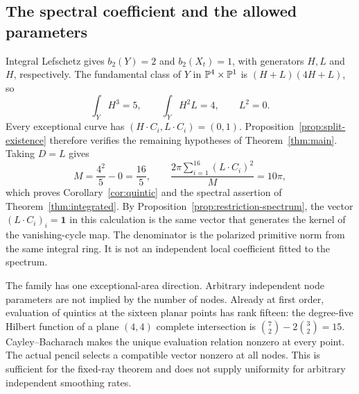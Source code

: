 \subsection{The spectral coefficient and the allowed parameters}
Integral Lefschetz gives $b_2(Y)=2$ and $b_2(X_t)=1$, with generators
$H,L$ and $H$, respectively. The fundamental class of $Y$ in
$\mathbb P^4\times\mathbb P^1$ is $(H+L)(4H+L)$, so
\begin{equation}\label{eq:split-cubic}
 \int_YH^3=5,\qquad \int_YH^2L=4,\qquad L^2=0.
\end{equation}
Every exceptional curve has $(H\cdot C_i,L\cdot C_i)=(0,1)$.
Proposition~\ref{prop:split-existence} therefore verifies the remaining
hypotheses of Theorem~\ref{thm:main}. Taking $D=L$ gives
\[
 M=\frac{4^2}{5}-0=\frac{16}{5},\qquad
 \frac{2\pi\sum_{i=1}^{16}(L\cdot C_i)^2}{M}=10\pi,
\]
which proves Corollary~\ref{cor:quintic} and the spectral assertion of
Theorem~\ref{thm:integrated}.
By Proposition~\ref{prop:restriction-spectrum}, the vector
$(L\cdot C_i)_i=\mathbf1$ in this calculation is the same vector
that generates the kernel of the vanishing-cycle map. The denominator
is the polarized primitive norm from the same integral ring. It is
not an independent local coefficient fitted to the spectrum.

The family has one exceptional-area direction. Arbitrary independent
node parameters are not implied by the number of nodes. Already at
first order, evaluation of quintics at the sixteen planar points has
rank fifteen: the degree-five Hilbert function of a plane $(4,4)$
complete intersection is $\binom72-2\binom32=15$.
Cayley--Bacharach makes the unique evaluation relation nonzero at every
point. The actual pencil selects a compatible vector nonzero at all
nodes. This is sufficient for the fixed-ray theorem and does not
supply uniformity for arbitrary independent smoothing rates.
